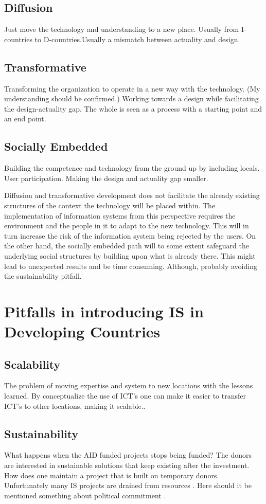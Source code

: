 \subsection{Diffusion}
Just move the technology and understanding to a new place. Usually from I-countries to D-countries.Usually a mismatch between actuality and design.
\subsection{Transformative}
Transforming the organization to operate in a new way with the technology. (My understanding should be confirmed.)
Working towards a design while facilitating the design-actuality gap. The whole is seen as a process with a starting point and an end point.
\subsection{Socially Embedded}
Building the competence and technology from the ground up by including locals. User participation. Making the design and actuality gap smaller. 

Diffusion and transformative development does not facilitate the already existing structures of the context the technology will be placed within.
The implementation of information systems from this perspective requires the environment and the people in it to adapt to the new technology.
This will in turn increase the risk of the information system being rejected by the users. On the other hand, the socially embedded path
will to some extent safeguard the underlying social structures by building upon what is already there. 
This might lead to unexpected results and be time consuming. Although, probably avoiding the sustainability pitfall.

\section{Pitfalls in introducing IS in Developing Countries}
\subsection{Scalability}
The problem of moving expertise and system to new locations with the lessons learned.
By conceptualize the use of ICT's one can make it easier to transfer ICT's to other locations, making it scalable.\cite{jbemss:noa}.
\subsection{Sustainability}
What happens when the AID funded projects stops being funded? The donors are interested in sustainable solutions that keep existing after the investment.
How does one maintain a project that is built on temporary donors. Unfortunately many IS projects are drained from resources \cite{ca:isdc}.
Here should it be mentioned something about political commitment \cite{jbemss:noa}.  

